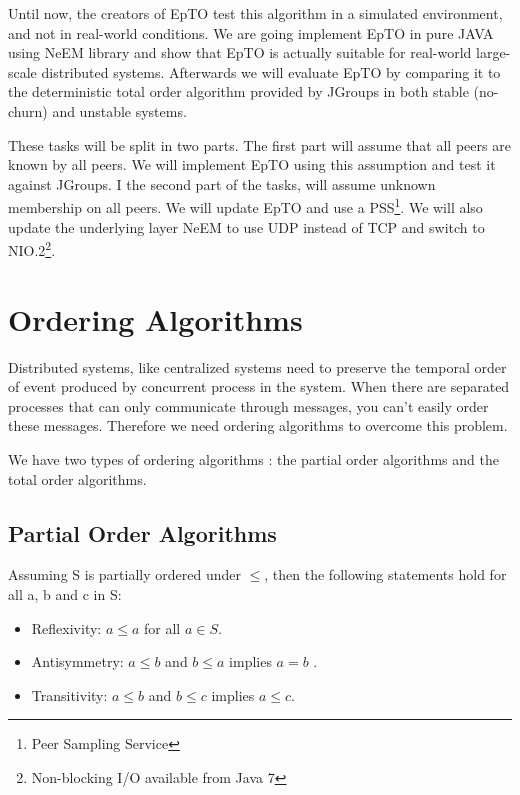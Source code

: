 \documentclass[10pt,conference,a4paper]{IEEEtran}
\begin{document}
\par
Until now, the creators of EpTO test this algorithm in a simulated environment, and not in real-world conditions. We are going implement EpTO in pure JAVA using NeEM library \autocite{neem} and show that EpTO is actually suitable for real-world large-scale distributed systems. Afterwards we will evaluate EpTO by comparing it to the deterministic total order algorithm provided by JGroups  \autocite{jgroups} in both stable (no-churn) and unstable systems.
\par
These tasks will be split in two parts. The first part will assume that all peers are known by all peers. We will implement EpTO using this assumption and test it against JGroups. I the second part of the tasks, will assume unknown membership on all peers. We will update EpTO and use a PSS\footnote{Peer Sampling Service}. We will also update the underlying layer NeEM to use UDP instead of TCP and switch to NIO.2\footnote{Non-blocking I/O available from Java 7}.

\section{Ordering Algorithms}

Distributed systems, like centralized systems need to preserve the temporal order of event produced by concurrent process in the system. When there are separated processes that can only communicate through messages, you can’t easily order these messages.
Therefore we need ordering algorithms to overcome this problem.
\par
We have two types of ordering algorithms \autocite{lamport1978time}: the partial order algorithms and the total order algorithms.
\subsection{Partial Order Algorithms}
Assuming S is partially ordered under $\leq$, then the following statements hold for all a, b and c in S:
\begin{itemize}
	\item Reflexivity: $a \leq a$ for all $a \in S$.
	\item Antisymmetry: $a \leq b$ and $b \leq a$ implies $a=b$ .
	\item Transitivity: $a \leq b$  and $b \leq c$  implies $a \leq c$.
\end{itemize}
\end{document}

